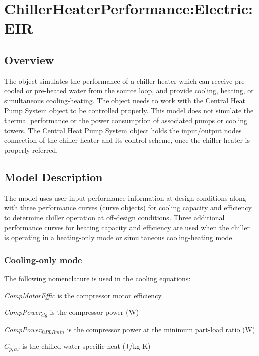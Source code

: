 \section{ChillerHeaterPerformance:Electric:EIR }\label{chillerheaterperformanceelectriceir}

\subsection{Overview}\label{overview-008}

The object simulates the performance of a chiller-heater which can receive pre-cooled or pre-heated water from the source loop, and provide cooling, heating, or simultaneous cooling-heating. The object needs to work with the Central Heat Pump System object to be controlled properly. This model does not simulate the thermal performance or the power consumption of associated pumps or cooling towers. The Central Heat Pump System object holds the input/output nodes connection of the chiller-heater and its control scheme, once the chiller-heater is properly referred.

\subsection{Model Description}\label{model-description-005}

The model uses user-input performance information at design conditions along with three performance curves (curve objects) for cooling capacity and efficiency to determine chiller operation at off-design conditions. Three additional performance curves for heating capacity and efficiency are used when the chiller is operating in a heating-only mode or simultaneous cooling-heating mode.

\subsubsection{Cooling-only mode}\label{cooling-only-mode}

The following nomenclature is used in the cooling equations:

\emph{CompMotorEffic} is the compressor motor efficiency

\emph{CompPower\(_{clg}\)} is the compressor power (W)

\emph{CompPower\(_{@PLRmin}\)} is the compressor power at the minimum part-load ratio (W)

\({C_{p,cw}}\) is the chilled water specific heat (J/kg-K)

